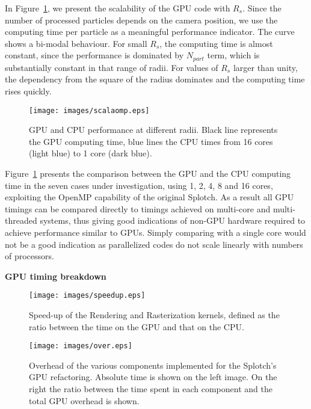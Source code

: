 \documentclass[1p]{elsarticle}
\begin{document}
In Figure~\ref{fig:gpucpu}, we present the scalability of the GPU code 
with $R_s$. Since the number of processed particles depends on
the camera position, we use the  
computing time per particle as a meaningful performance
indicator. The curve shows a bi-modal behaviour. For small $R_s$,
the computing time is almost constant, since the performance is dominated
by $N_{part}$ term, which is substantially constant in that range of 
radii. For values of $R_s$ larger 
than unity, the dependency from the square of the radius dominates and the computing time 
rises quickly. 

\begin{figure}
\centering
\texttt{[image: images/scalaomp.eps]}
\caption{GPU and CPU performance at different radii. Black line represents the GPU 
computing time, blue lines the CPU times from 16 cores (light blue) to 1 core
(dark blue).}
\label{fig:gpucpu}
\end{figure}

Figure~\ref{fig:gpucpu} presents the comparison between the GPU and the CPU computing time
in the seven cases under investigation, using 
1, 2, 4, 8 and 16 cores, exploiting 
the OpenMP \cite{openmpurl} capability of the original Splotch. As a result all GPU timings can be compared directly to
timings achieved on multi-core and multi-threaded systems, thus giving good indications of non-GPU 
hardware required to achieve performance similar to GPUs. Simply comparing with a single core would not 
be a good indication as parallelized codes do not scale linearly with numbers of processors.

\medskip
\noindent
{\bf GPU timing breakdown}

\begin{figure}
\centering
\texttt{[image: images/speedup.eps]}
\caption{
Speed-up of the Rendering and Rasterization kernels, defined as the ratio
between the time on the GPU and that on the CPU.
}
\label{fig:speedup}
\end{figure}

\begin{figure}
\centering
\texttt{[image: images/over.eps]}
\caption{Overhead of the various components implemented for the Splotch's
GPU refactoring. Absolute time is shown on the left image. On the right
the ratio between the time spent in each component and the total GPU 
overhead is shown.}
\label{fig:over}
\end{figure}
\end{document}

